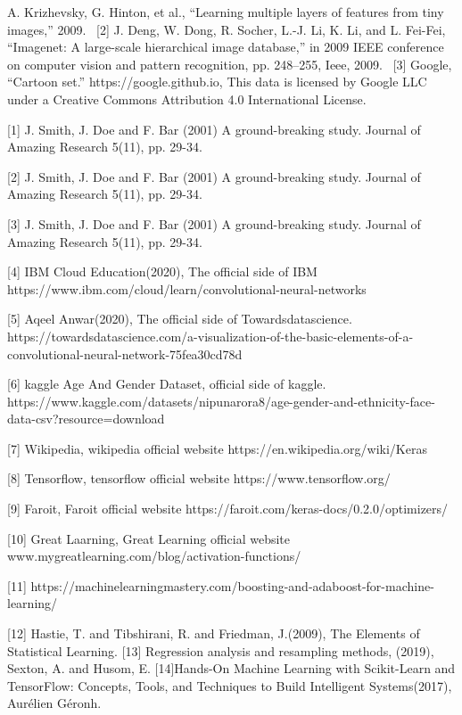 \begin{References}
[1] A. Krizhevsky, G. Hinton, et al., “Learning multiple layers of features
from tiny images,” 2009.
\
[2] J. Deng, W. Dong, R. Socher, L.-J. Li, K. Li, and L. Fei-Fei, “Imagenet:
A large-scale hierarchical image database,” in 2009 IEEE conference on
computer vision and pattern recognition, pp. 248–255, Ieee, 2009.
\
[3] Google, “Cartoon set.” https://google.github.io,
This data is licensed by Google LLC under a Creative Commons
Attribution 4.0 International License.

[1] J. Smith, J. Doe and F. Bar (2001) A ground-breaking study.
Journal of Amazing Research 5(11), pp. 29-34.

[2] J. Smith, J. Doe and F. Bar (2001) A ground-breaking study.
Journal of Amazing Research 5(11), pp. 29-34.

[3] J. Smith, J. Doe and F. Bar (2001) A ground-breaking study.
Journal of Amazing Research 5(11), pp. 29-34.

[4] IBM Cloud Education(2020), The official side of IBM
https://www.ibm.com/cloud/learn/convolutional-neural-networks

[5] Aqeel Anwar(2020), The official side of Towardsdatascience.
https://towardsdatascience.com/a-visualization-of-the-basic-elements-of-a-convolutional-neural-network-75fea30cd78d

[6] kaggle Age And Gender Dataset, official side of kaggle.
https://www.kaggle.com/datasets/nipunarora8/age-gender-and-ethnicity-face-data-csv?resource=download

[7] Wikipedia, wikipedia official website
https://en.wikipedia.org/wiki/Keras

[8] Tensorflow, tensorflow official website
https://www.tensorflow.org/

[9] Faroit, Faroit official website
https://faroit.com/keras-docs/0.2.0/optimizers/

[10] Great Laarning, Great Learning official website
www.mygreatlearning.com/blog/activation-functions/

[11] https://machinelearningmastery.com/boosting-and-adaboost-for-machine-learning/

[12] Hastie, T. and Tibshirani, R. and Friedman, J.(2009), The Elements of Statistical Learning.
[13] Regression analysis and resampling methods, (2019), Sexton, A. and Husom, E.
[14]Hands-On Machine Learning with Scikit-Learn and TensorFlow: Concepts, Tools, and Techniques to Build Intelligent Systems(2017), Aurélien Géronh.

\end{References}